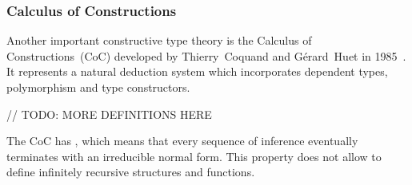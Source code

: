 \documentclass[article]{aaltoseries}
\begin{document}


\subsubsection{Calculus of Constructions}

Another important constructive type theory is the Calculus of Constructions~(CoC) developed by Thierry~Coquand and Gérard~Huet in 1985~\cite{Coq85}. It represents a natural deduction system which incorporates dependent types, polymorphism and type constructors.

// TODO: MORE DEFINITIONS HERE


The CoC has , which means that every sequence of inference eventually terminates with an irreducible normal form. This property does not allow to define infinitely recursive structures and functions. %

%
\end{document}
